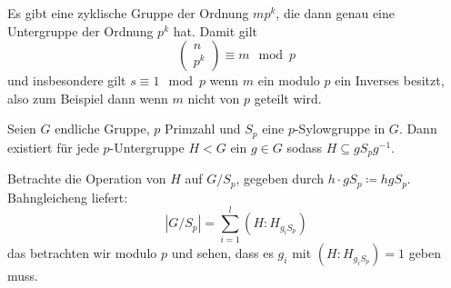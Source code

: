 Es gibt eine zyklische Gruppe der Ordnung \(mp^k\), die dann genau eine Untergruppe der Ordnung \(p^k\) hat. Damit gilt
\[
  \left(
  \begin{array}{c}
    n \\
    p^k
  \end{array}
  \right)\equiv m \mod p
  \]
und insbesondere gilt \(s\equiv 1\mod p\) wenn \(m\) ein modulo \(p\) ein Inverses besitzt, also zum Beispiel dann wenn \(m\) nicht von \(p\) geteilt wird.
 
\begin{lemma}
  Seien \(G\) endliche Gruppe, \(p\) Primzahl und \(S_p\) eine \(p\)-Sylowgruppe in \(G\). Dann existiert für jede \(p\)-Untergruppe \(H<G\) ein \(g\in G\) sodass \(H\subseteq gS_pg^{-1}\).
\end{lemma}

\begin{beweis}
  Betrachte die Operation von \(H\) auf \(G/S_p\), gegeben durch \(h\cdot gS_p\coloneq hgS_p\).
  Bahngleicheng liefert:
  \[
  |G/S_p|=\sum_{i=1}^l (H : H_{g_iS_p})
  \]
  das betrachten wir modulo \(p\) und sehen, dass es \(g_i\) mit \((H:H_{g_iS_p})=1\) geben muss.
\end{beweis}


